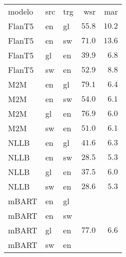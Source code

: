 \begin{tabular}{lllrr}
modelo & src & trg & wsr & mar \\
FlanT5 & en & gl & $55.8$ & $10.2$ \\
FlanT5 & en & sw & $71.0$ & $13.6$ \\
FlanT5 & gl & en & $39.9$ & $6.8$ \\
FlanT5 & sw & en & $52.9$ & $8.8$ \\
M2M & en & gl & $79.1$ & $6.4$ \\
M2M & en & sw & $54.0$ & $6.1$ \\
M2M & gl & en & $76.9$ & $6.0$ \\
M2M & sw & en & $51.0$ & $6.1$ \\
NLLB & en & gl & $41.6$ & $6.3$ \\
NLLB & en & sw & $28.5$ & $5.3$ \\
NLLB & gl & en & $37.5$ & $6.0$ \\
NLLB & sw & en & $28.6$ & $5.3$ \\
mBART & en & gl &  &  \\
mBART & en & sw &  &  \\
mBART & gl & en & $77.0$ & $6.6$ \\
mBART & sw & en &  &  \\
\end{tabular}
